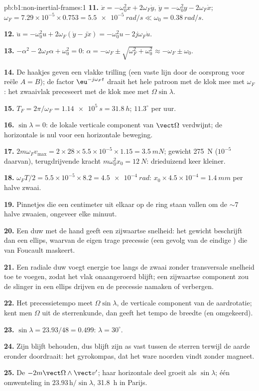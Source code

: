 \begin{solution}{pb:b1:non-inertial-frames:1}
\textbf{11.} $\ddot x = -\omega_0^2x + 2\omega_F\dot y$, $\ddot y = -\omega_0^2y -
2\omega_F\dot x$; $\omega_F = 7.29\times10^{-5} \times 0.753 = \qty{5.5e-5}{rad/s}
\ll \omega_0 = \qty{0.38}{rad/s}$.

\textbf{12.} $\ddot u = -\omega_0^2u + 2\omega_F(\dot y - j\dot x) = -\omega_0^2u -
2j\omega_F\dot u$.

\textbf{13.} $-\alpha^2 - 2\omega_F\alpha + \omega_0^2 = 0$: $\alpha = -\omega_F \pm
\sqrt{\omega_F^2 + \omega_0^2} \approx -\omega_F \pm \omega_0$.

\textbf{14.} De haakjes geven een vlakke trilling (een vaste lijn door de
oorsprong voor reële $A = B$); de factor $\eu^{-j\omega_Ft}$ draait het hele
patroon met de klok mee met $\omega_F$: het zwaaivlak preceseert met de klok mee met
$\Omega\sin\lambda$.

\textbf{15.} $T_F = 2\pi/\omega_F = \qty{1.14e5}{s} = \qty{31.8}{h}$; $11.3^\circ$
per uur.

\textbf{16.} $\sin\lambda = 0$: de lokale verticale component van $\vect\Omega$
verdwijnt; de horizontale  is nul voor een horizontale beweging.

\textbf{17.} $2m\omega_Fv_{\max} = 2 \times 28 \times 5.5\times10^{-5} \times 1.15 =
\qty{3.5}{mN}$; gewicht \qty{275}{N} ($10^{-5}$ daarvan), terugdrijvende kracht
$m\omega_0^2x_0 = \qty{12}{N}$: drieduizend keer kleiner.

\textbf{18.} $\omega_FT/2 = 5.5\times10^{-5} \times 8.2 = \qty{4.5e-4}{rad}$:
$x_0 \times 4.5\times10^{-4} = \qty{1.4}{mm}$ per halve zwaai.

\textbf{19.} Pinnetjes die een centimeter uit elkaar op de ring staan vallen om de $\sim 7$
halve zwaaien, ongeveer elke minuut.

\textbf{20.} Een duw met de hand geeft een zijwaartse snelheid: het gewicht
beschrijft dan een ellips, waarvan de eigen trage precessie (een gevolg van de
eindige ) die van Foucault maskeert.

\textbf{21.} Een radiale duw voegt energie toe langs de zwaai zonder
transversale snelheid toe te voegen, zodat het vlak onaangeroerd blijft; een zijwaartse
component zou de slinger in een ellips drijven en de precessie namaken of
verbergen.

\textbf{22.} Het precessietempo meet $\Omega\sin\lambda$, de verticale
component van de aardrotatie; kent men $\Omega$ uit de sterrenkunde, dan geeft het
tempo de breedte (en omgekeerd).

\textbf{23.} $\sin\lambda = 23.93/48 = 0.499$: $\lambda = 30^\circ$.

\textbf{24.} Zijn  blijft behouden, dus blijft zijn as vast
tussen de sterren terwijl de aarde eronder doordraait: het gyrokompas, dat
het ware noorden vindt zonder magneet.

\textbf{25.} De  $-2m\vect\Omega\wedge\vect v'$; haar horizontale
deel groeit als $\sin\lambda$; één omwenteling in $23.93\,\text{h}/\sin\lambda$,
\qty{31.8}{h} in Parijs.
\end{solution}
